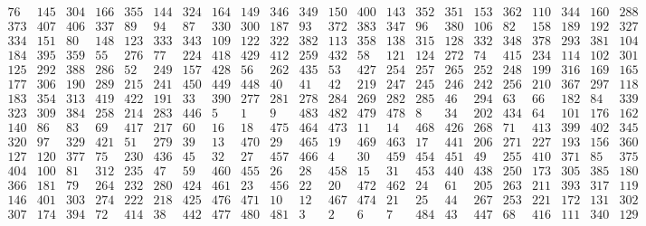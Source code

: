 \documentclass[11pt,a4paper]{article}
\begin{document}
\[
\begin{array}{|c|c|c|c|c|c|c|c|c|c|c|c|c|c|c|c|c|c|c|c|c|c|}
\hline
76 & 145 & 304 & 166 & 355 & 144 & 324 & 164 & 149 & 346 & 349 & 150 & 400 & 143 & 352 & 351 & 153 & 362 & 110 & 344 & 160 & 288 \\
\hline
373 & 407 & 406 & 337 & 89 & 94 & 87 & 330 & 300 & 187 & 93 & 372 & 383 & 347 & 96 & 380 & 106 & 82 & 158 & 189 & 192 & 327 \\
\hline
334 & 151 & 80 & 148 & 123 & 333 & 343 & 109 & 122 & 322 & 382 & 113 & 358 & 138 & 315 & 128 & 332 & 348 & 378 & 293 & 381 & 104 \\
\hline
184 & 395 & 359 & 55 & 276 & 77 & 224 & 418 & 429 & 412 & 259 & 432 & 58 & 121 & 124 & 272 & 74 & 415 & 234 & 114 & 102 & 301 \\
\hline
125 & 292 & 388 & 286 & 52 & 249 & 157 & 428 & 56 & 262 & 435 & 53 & 427 & 254 & 257 & 265 & 252 & 248 & 199 & 316 & 169 & 165 \\
\hline
177 & 306 & 190 & 289 & 215 & 241 & 450 & 449 & 448 & 40 & 41 & 42 & 219 & 247 & 245 & 246 & 242 & 256 & 210 & 367 & 297 & 118 \\
\hline
183 & 354 & 313 & 419 & 422 & 191 & 33 & 390 & 277 & 281 & 278 & 284 & 269 & 282 & 285 & 46 & 294 & 63 & 66 & 182 & 84 & 339 \\
\hline
323 & 309 & 384 & 258 & 214 & 283 & 446 & 5 & 1 & 9 & 483 & 482 & 479 & 478 & 8 & 34 & 202 & 434 & 64 & 101 & 176 & 162 \\
\hline
140 & 86 & 83 & 69 & 417 & 217 & 60 & 16 & 18 & 475 & 464 & 473 & 11 & 14 & 468 & 426 & 268 & 71 & 413 & 399 & 402 & 345 \\
\hline
320 & 97 & 329 & 421 & 51 & 279 & 39 & 13 & 470 & 29 & 465 & 19 & 469 & 463 & 17 & 441 & 206 & 271 & 227 & 193 & 156 & 360 \\
\hline
127 & 120 & 377 & 75 & 230 & 436 & 45 & 32 & 27 & 457 & 466 & 4 & 30 & 459 & 454 & 451 & 49 & 255 & 410 & 371 & 85 & 375 \\
\hline
404 & 100 & 81 & 312 & 235 & 47 & 59 & 460 & 455 & 26 & 28 & 458 & 15 & 31 & 453 & 440 & 438 & 250 & 173 & 305 & 385 & 180 \\
\hline
366 & 181 & 79 & 264 & 232 & 280 & 424 & 461 & 23 & 456 & 22 & 20 & 472 & 462 & 24 & 61 & 205 & 263 & 211 & 393 & 317 & 119 \\
\hline
146 & 401 & 303 & 274 & 222 & 218 & 425 & 476 & 471 & 10 & 12 & 467 & 474 & 21 & 25 & 44 & 267 & 253 & 221 & 172 & 131 & 302 \\
\hline
307 & 174 & 394 & 72 & 414 & 38 & 442 & 477 & 480 & 481 & 3 & 2 & 6 & 7 & 484 & 43 & 447 & 68 & 416 & 111 & 340 & 129 \\

\end{array}\]
\end{document}
